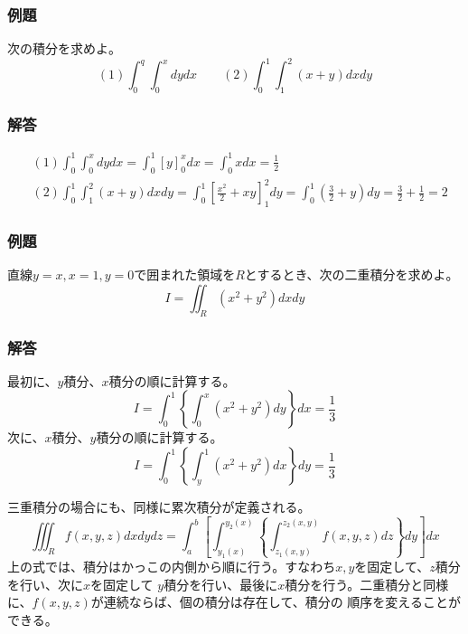 \documentclass[a4j,dvipdfmx]{jsarticle}
\begin{document}
\subsubsection*{例題}
次の積分を求めよ。
\begin{equation*}
    (1)\int_0^q\int_0^xdydx\qquad(2)\int_0^1\int_1^2(x+y)dxdy
\end{equation*}

\subsubsection*{解答}
\begin{align*}
    &(1)\int_0^1\int_0^xdydx=\int_0^1[y]_0^xdx=\int_0^1xdx=\frac{1}{2}\\
    &(2)\int_0^1\int_1^2(x+y)dxdy=\int_0^1\left[\frac{x^2}{2}+xy\right]_1^2dy=
    \int_0^1(\frac{3}{2}+y)dy=\frac{3}{2}+\frac{1}{2}=2
\end{align*}

\subsubsection*{例題}
直線$y=x,x=1,y=0$で囲まれた領域を$R$とするとき、次の二重積分を求めよ。
\begin{equation*}
    I=\iint_R(x^2+y^2)dxdy
\end{equation*}

\subsubsection*{解答}
最初に、$y$積分、$x$積分の順に計算する。
\begin{equation*}
    I=\int_0^1\left\{\int_0^x (x^2+y^2)dy\right\}dx=\frac{1}{3}
\end{equation*}
次に、$x$積分、$y$積分の順に計算する。
\begin{equation*}
    I=\int_0^1\left\{\int_y^1(x^2+y^2)dx\right\}dy=\frac{1}{3}
\end{equation*}


三重積分の場合にも、同様に累次積分が定義される。
\begin{equation}
    \iiint_R f(x,y,z)dxdydz=\int_a^b\left[\int_{y_1(x)}^{y_2(x)}\left\{\int_{z_1(x,y)}^{z_2(x,y)}f(x,y,z)dz\right\}dy\right]dx\label{6.14}
\end{equation}
上の式では、積分はかっこの内側から順に行う。すなわち$x,y$を固定して、$z$積分を行い、次に$x$を固定して
$y$積分を行い、最後に$x$積分を行う。二重積分と同様に、$f(x,y,z)$が連続ならば、個の積分は存在して、積分の
順序を変えることができる。
\end{document}
